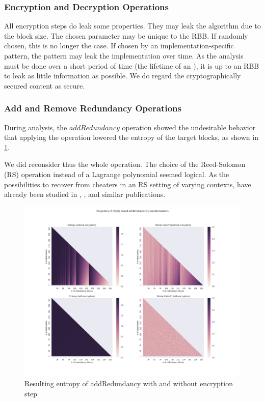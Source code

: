 \subsubsection{Encryption and Decryption Operations}
All encryption steps do leak some properties. They may leak the algorithm due to the block size. The chosen parameter may be unique to the RBB. If randomly chosen, this is no longer the case. If chosen by an implementation-specific pattern, the pattern may leak the implementation over time. As the analysis must be done over a short period of time (the lifetime of an ), it is up to an RBB to leak as little information as possible. We do regard the cryptographically secured content as secure. 

\subsubsection{Add and Remove Redundancy Operations}\label{sec:analysisReedSolomon}
During analysis, the $addRedundancy$ operation showed the undesirable behavior that applying the operation lowered the entropy of the target blocks, as shown in \cref{fig:entropy}. 

We did reconsider thus the whole operation. The choice of the Reed-Solomon (RS) operation instead of a Lagrange polynomial seemed logical. As the possibilities to recover from cheaters in an RS setting of varying contexts, have already been studied in \cite{mceliece1981sharing}, \cite{bu2017rasss}, and similar publications.

\begin{figure}[!t]\centering
	\includegraphics[width=1\textwidth]{inc/randomblock_10kb}
	\caption{Resulting entropy of addRedundancy with and without encryption step}
	\label{fig:entropy}
\end{figure}


